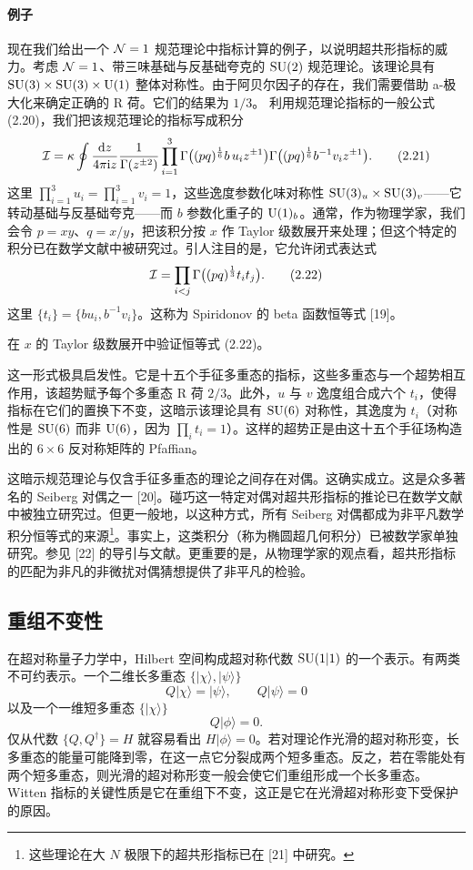 \paragraph{例子} 现在我们给出一个 $\mathcal{N}=1$ 规范理论中指标计算的例子，以说明超共形指标的威力。考虑 $\mathcal{N}=1$、带三味基础与反基础夸克的 $\operatorname{SU}(2)$ 规范理论。该理论具有 $\operatorname{SU}(3)\times\operatorname{SU}(3)\times\operatorname{U}(1)$ 整体对称性。由于阿贝尔因子的存在，我们需要借助 a-极大化来确定正确的 R 荷。它们的结果为 $1/3$。
利用规范理论指标的一般公式 (2.20)，我们把该规范理论的指标写成积分
\[
\mathcal{I}=\kappa\oint\frac{\mathrm{d} z}{4\pi\mathrm{i} z}\frac{1}{\Gamma(z^{\pm2})}\prod_{i=1}^{3}\Gamma\big((pq)^{\frac16}b\,u_i z^{\pm1}\big)\Gamma\big((pq)^{\frac16}b^{-1}v_i z^{\pm1}\big) .
\tag{2.21}
\]
这里 $\prod_{i=1}^3 u_i=\prod_{i=1}^3 v_i=1$，这些逸度参数化味对称性 $\operatorname{SU}(3)_u\times\operatorname{SU}(3)_v$——它转动基础与反基础夸克——而 $b$ 参数化重子的 $\operatorname{U}(1)_b$。通常，作为物理学家，我们会令 $p=xy$、$q=x/y$，把该积分按 $x$ 作 Taylor 级数展开来处理；但这个特定的积分已在数学文献中被研究过。引人注目的是，它允许闭式表达式
\[
\mathcal{I}=\prod_{i<j}\Gamma\big((pq)^{\frac13}t_it_j\big) .
\tag{2.22}
\]
这里 $\{t_i\}=\{bu_i,b^{-1}v_i\}$。这称为 Spiridonov 的 beta 函数恒等式 [19]。
\begin{exercise}[2.3]
在 $x$ 的 Taylor 级数展开中验证恒等式 (2.22)。
\end{exercise}
这一形式极具启发性。它是十五个手征多重态的指标，这些多重态与一个超势相互作用，该超势赋予每个多重态 R 荷 $2/3$。此外，$u$ 与 $v$ 逸度组合成六个 $t_i$，使得指标在它们的置换下不变，这暗示该理论具有 $\operatorname{SU}(6)$ 对称性，其逸度为 $t_i$（对称性是 $\operatorname{SU}(6)$ 而非 $\operatorname{U}(6)$，因为 $\prod_i t_i=1$）。这样的超势正是由这十五个手征场构造出的 $6\times6$ 反对称矩阵的 Pfaffian。

这暗示规范理论与仅含手征多重态的理论之间存在对偶。这确实成立。这是众多著名的 Seiberg 对偶之一 [20]。碰巧这一特定对偶对超共形指标的推论已在数学文献中被独立研究过。但更一般地，以这种方式，所有 Seiberg 对偶都成为非平凡数学积分恒等式的来源\footnote{这些理论在大 $N$ 极限下的超共形指标已在 [21] 中研究。}。事实上，这类积分（称为椭圆超几何积分）已被数学家单独研究。参见 [22] 的导引与文献。更重要的是，从物理学家的观点看，超共形指标的匹配为非凡的非微扰对偶猜想提供了非平凡的检验。

\subsection{重组不变性}

在超对称量子力学中，Hilbert 空间构成超对称代数 $\operatorname{SU}(1|1)$ 的一个表示。有两类不可约表示。一个二维长多重态 $\{|\chi\rangle,|\psi\rangle\}$
\[
Q|\chi\rangle=|\psi\rangle,\qquad Q|\psi\rangle=0
\tag{2.23}
\]
以及一个一维短多重态 $\{|\chi\rangle\}$
\[
Q|\phi\rangle=0 .
\tag{2.24}
\]
仅从代数 $\{Q,Q^\dagger\}=H$ 就容易看出 $H|\phi\rangle=0$。若对理论作光滑的超对称形变，长多重态的能量可能降到零，在这一点它分裂成两个短多重态。反之，若在零能处有两个短多重态，则光滑的超对称形变一般会使它们重组形成一个长多重态。Witten 指标的关键性质是它在重组下不变，这正是它在光滑超对称形变下受保护的原因。

